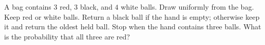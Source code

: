 A bag contains $3$ red, $3$ black, and $4$ white balls. Draw uniformly from the bag. Keep red or white balls. Return a black ball if the hand is empty; otherwise keep it and return the oldest held ball. Stop when the hand contains three balls. What is the probability that all three are red?
